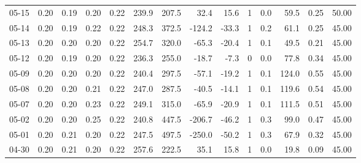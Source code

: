 \begin{threeparttable}
{\begin{tabular}{lrrrrrrrrrrrrr}
  05-15 &          0.20 &          0.19 &          0.20 &        0.22 &               239.9 &               207.5 &       32.4 &         15.6 &              1 &                 0.0 &             59.5 &            0.25 &                  50.00 \\
  05-14 &          0.20 &          0.19 &          0.22 &        0.22 &               248.3 &               372.5 &     -124.2 &        -33.3 &              1 &                 0.2 &             61.1 &            0.25 &                  45.00 \\
  05-13 &          0.20 &          0.20 &          0.20 &        0.22 &               254.7 &               320.0 &      -65.3 &        -20.4 &              1 &                 0.1 &             49.5 &            0.21 &                  45.00 \\
  05-12 &          0.20 &          0.19 &          0.20 &        0.22 &               236.3 &               255.0 &      -18.7 &         -7.3 &              0 &                 0.0 &             77.8 &            0.34 &                  45.00 \\
  05-09 &          0.20 &          0.20 &          0.20 &        0.22 &               240.4 &               297.5 &      -57.1 &        -19.2 &              1 &                 0.1 &            124.0 &            0.55 &                  45.00 \\
  05-08 &          0.20 &          0.20 &          0.21 &        0.22 &               247.0 &               287.5 &      -40.5 &        -14.1 &              1 &                 0.1 &            119.6 &            0.54 &                  45.00 \\
  05-07 &          0.20 &          0.20 &          0.23 &        0.22 &               249.1 &               315.0 &      -65.9 &        -20.9 &              1 &                 0.1 &            111.5 &            0.51 &                  45.00 \\
  05-02 &          0.20 &          0.20 &          0.25 &        0.22 &               240.8 &               447.5 &     -206.7 &        -46.2 &              1 &                 0.3 &             99.0 &            0.47 &                  45.00 \\
  05-01 &          0.20 &          0.21 &          0.20 &        0.22 &               247.5 &               497.5 &     -250.0 &        -50.2 &              1 &                 0.3 &             67.9 &            0.32 &                  45.00 \\
  04-30 &          0.20 &          0.21 &          0.20 &        0.22 &               257.6 &               222.5 &       35.1 &         15.8 &              1 &                 0.0 &             19.8 &            0.09 &                  45.00 \\

\end{tabular}}
\end{threeparttable}
